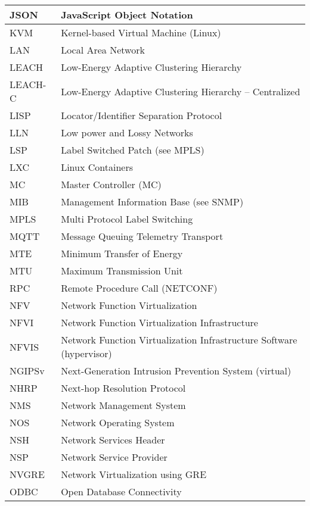 \begin{longtable}{ll}
  JSON		&		JavaScript Object Notation		\\ \midrule
  KVM		&		Kernel-based Virtual Machine (Linux)		\\ \midrule
  LAN		&		Local Area Network		\\ \midrule
  LEACH		&		Low-Energy Adaptive Clustering Hierarchy		\\ \midrule
  LEACH-C	&		Low-Energy Adaptive Clustering Hierarchy – Centralized		\\ \midrule
  LISP		&		Locator/Identifier Separation Protocol		\\ \midrule
  LLN		&		Low power and Lossy Networks		\\ \midrule
  LSP		&		Label Switched Patch (see MPLS)		\\ \midrule
  LXC		&		Linux Containers		\\ \midrule
  MC		&		Master Controller (MC)		\\ \midrule
  MIB		&		Management Information Base (see SNMP)		\\ \midrule
  MPLS		&		Multi Protocol Label Switching		\\ \midrule
  MQTT		&		Message Queuing Telemetry Transport		\\ \midrule
  MTE		&		Minimum Transfer of Energy		\\ \midrule
  MTU		&		Maximum Transmission Unit		\\ \midrule
  RPC		&		Remote Procedure Call (NETCONF)		\\ \midrule
  NFV		&		Network Function Virtualization		\\ \midrule
  NFVI		&		Network Function Virtualization Infrastructure		\\ \midrule
  NFVIS		&		Network Function Virtualization Infrastructure Software (hypervisor)		\\ \midrule
  NGIPSv	&		Next-Generation Intrusion Prevention System (virtual)		\\ \midrule
  NHRP		&		Next-hop Resolution Protocol		\\ \midrule
  NMS		&		Network Management System		\\ \midrule
  NOS		&		Network Operating System		\\ \midrule
  NSH		&		Network Services Header		\\ \midrule
  NSP		&		Network Service Provider		\\ \midrule
  NVGRE		&		Network Virtualization using GRE		\\ \midrule
  ODBC		&		Open Database Connectivity		\\ \midrule

\end{longtable}
